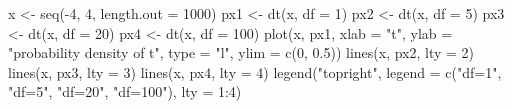 \begin{Schunk}
\begin{Sinput}
 x <- seq(-4, 4, length.out = 1000)
 px1 <- dt(x, df = 1)
 px2 <- dt(x, df = 5)
 px3 <- dt(x, df = 20)
 px4 <- dt(x, df = 100)
 plot(x, px1, xlab = "t", ylab = "probability density of t", type = "l", ylim = c(0, 
      0.5))
 lines(x, px2, lty = 2)
 lines(x, px3, lty = 3)
 lines(x, px4, lty = 4)
 legend("topright", legend = c("df=1", "df=5", "df=20", "df=100"), lty = 1:4)
\end{Sinput}
\end{Schunk}
